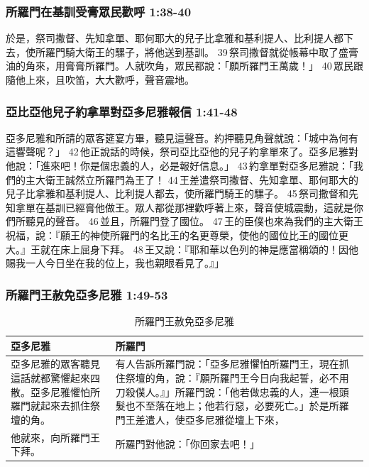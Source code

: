 \subsubsection{所羅門在基訓受膏眾民歡呼 1:38-40}
於是，祭司撒督、先知拿單、耶何耶大的兒子比拿雅和基利提人、比利提人都下去，使所羅門騎大衛王的騾子，將他送到基訓。 39 祭司撒督就從帳幕中取了盛膏油的角來，用膏膏所羅門。人就吹角，眾民都說：「願所羅門王萬歲！」 40 眾民跟隨他上來，且吹笛，大大歡呼，聲音震地。

\subsubsection{亞比亞他兒子約拿單對亞多尼雅報信 1:41-48}
亞多尼雅和所請的眾客筵宴方畢，聽見這聲音。約押聽見角聲就說：「城中為何有這響聲呢？」 42 他正說話的時候，祭司亞比亞他的兒子約拿單來了。亞多尼雅對他說：「進來吧！你是個忠義的人，必是報好信息。」 43 約拿單對亞多尼雅說：「我們的主大衛王誠然立所羅門為王了！ 44 王差遣祭司撒督、先知拿單、耶何耶大的兒子比拿雅和基利提人、比利提人都去，使所羅門騎王的騾子。 45 祭司撒督和先知拿單在基訓已經膏他做王。眾人都從那裡歡呼著上來，聲音使城震動，這就是你們所聽見的聲音。 46 並且，所羅門登了國位。 47 王的臣僕也來為我們的主大衛王祝福，說：『願王的神使所羅門的名比王的名更尊榮，使他的國位比王的國位更大。』王就在床上屈身下拜。 48 王又說：『耶和華以色列的神是應當稱頌的！因他賜我一人今日坐在我的位上，我也親眼看見了。』」

\subsubsection{所羅門王赦免亞多尼雅 1:49-53}
\begin{table}[!hbp]
\centering
\begin{tabular}{p{4.85cm}|p{13cm}}
\hline
\hline
亞多尼雅&所羅門\\\hline\hline
亞多尼雅的眾客聽見這話就都驚懼起來四散。亞多尼雅懼怕所羅門就起來去抓住祭壇的角。
&有人告訴所羅門說：「亞多尼雅懼怕所羅門王，現在抓住祭壇的角，說：『願所羅門王今日向我起誓，必不用刀殺僕人。』」所羅門說：「他若做忠義的人，連一根頭髮也不至落在地上；他若行惡，必要死亡。」於是所羅門王差遣人，使亞多尼雅從壇上下來，\\\hline
他就來，向所羅門王下拜。&所羅門對他說：「你回家去吧！」\\\hline
\end{tabular}
\caption{所羅門王赦免亞多尼雅}
\end{table}


